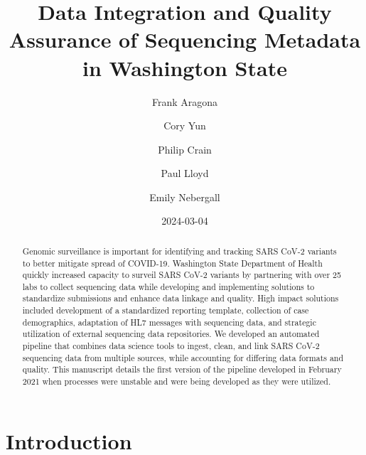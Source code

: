 \documentclass[
  letterpaper,
  DIV=11,
  numbers=noendperiod]{scrartcl}
\title{Data Integration and Quality Assurance of Sequencing Metadata in
Washington State}
\author{Frank Aragona \and Cory Yun \and Philip Crain \and Paul
Lloyd \and Emily Nebergall}
\date{2024-03-04}
\renewcommand*\contentsname{Table of contents}
\newcommand\contentsname{Table of contents}
\begin{document}
\maketitle
\begin{abstract}
Genomic surveillance is important for identifying and tracking SARS
CoV-2 variants to better mitigate spread of COVID-19. Washington State
Department of Health quickly increased capacity to surveil SARS CoV-2
variants by partnering with over 25 labs to collect sequencing data
while developing and implementing solutions to standardize submissions
and enhance data linkage and quality. High impact solutions included
development of a standardized reporting template, collection of case
demographics, adaptation of HL7 messages with sequencing data, and
strategic utilization of external sequencing data repositories. We
developed an automated pipeline that combines data science tools to
ingest, clean, and link SARS CoV-2 sequencing data from multiple
sources, while accounting for differing data formats and quality. This
manuscript details the first version of the pipeline developed in
February 2021 when processes were unstable and were being developed as
they were utilized.
\end{abstract}

\renewcommand*\contentsname{Table of contents}
{
\hypersetup{linkcolor=}
\setcounter{tocdepth}{3}
\tableofcontents
}
\section{Introduction}\label{introduction}
\end{document}
